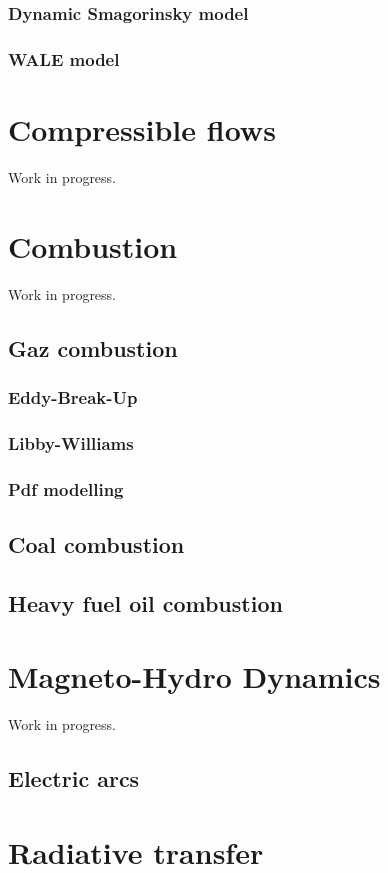 \documentclass[a4paper,10pt,twoside]{csdoc}
\newcounter{prog}[part]
\begin{document}
\subsection{Dynamic Smagorinsky model}
\subsection{WALE model}

\chapter{Compressible flows}
Work in progress.


\chapter{Combustion}
Work in progress.
\section{Gaz combustion}
\subsection{Eddy-Break-Up}
\subsection{Libby-Williams}
\subsection{Pdf modelling}
\section{Coal combustion}
\section{Heavy fuel oil combustion}

\chapter{Magneto-Hydro Dynamics}
Work in progress.
\section{Electric arcs}
\chapter{Radiative transfer}
\end{document}
